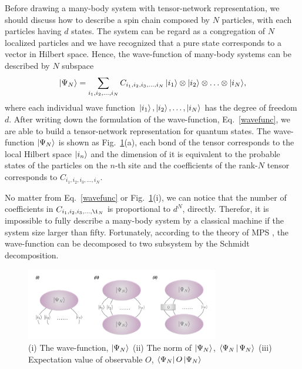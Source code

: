 Before drawing a many-body system with tensor-network representation, we should discuss how to describe a spin chain composed by $N$ particles, with each particles having $d$ states. The system can be regard as a congregation of $N$ localized particles and we have recognized that a pure state corresponds to a vector in Hilbert space. Hence, the wave-function of many-body systems can be described by $N$ subspace
\begin{align}
	\Ket{\Psi_{N}} =\sum_{i_1,i_2,\ldots,i_N}{C_{i_1,i_2,i_3,\ldots,i_N}\Ket{i_1}\otimes\Ket{i_2}\otimes \ldots \otimes \Ket{i_N}},
	\label{wavefunc}
\end{align}
where each individual wave function $\Ket{i_1}, \Ket{i_2},\ldots, \Ket{i_N}$ has the degree of freedom $d$. After writing down the formulation of the wave-function, Eq.~\ref{wavefunc}, we are able to build a tensor-network representation for quantum states. The wave-function $\Ket{\Psi_N}$ is shown as Fig.~\ref{fig225}(a), each bond of the tensor corresponds to the local Hilbert space $\Ket{i_n}$ and the dimension of it is equivalent to the probable states of the particles on the $n$-th site and the coefficients of the rank-$N$ tensor corresponds to $C_{i_1,i_2,i_3,\ldots,i_N}$.

No matter from Eq.~\ref{wavefunc} or Fig.~\ref{fig225}(i), we can notice that the number of coefficients in $C_{i_1,i_2,i_3,\ldots,\i_N}$ is proportional to $d^N$, directly. Therefor, it is impossible to fully describe a many-body system by a classical machine if the system size larger than fifty. Fortunately, according to the theory of MPS \cite{PhysRevB.73.094423, PhysRevLett.75.3537}, the wave-function can be decomposed to two subsystem by the Schmidt decomposition.
\begin{figure}[ht]
	\centering
	\includegraphics[width=0.75\textwidth]{figures/fig225.png}
	\caption[Represent wave-function of quntum states of TN]{(i) The wave-function, $\Ket{\Psi_N}$ (ii) The norm of $\Ket{\Psi_N}$, $\Braket{\Psi_N|\Psi_N}$ (iii) Expectation value of observable $O$, $\Bra{\Psi_N}O\Ket{\Psi_N}$}
	\label{fig225}
\end{figure}

